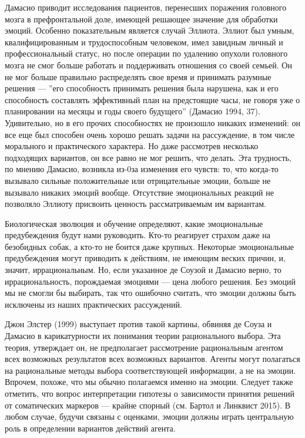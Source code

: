 \documentclass[11pt]{book}
\begin{document}
Дамасио приводит исследования пациентов, перенесших поражения головного мозга в префронтальной доле, имеющей решающее значение для обработки эмоций. Особенно показательным является случай Эллиота. Эллиот был умным, квалифицированным и трудоспособным человеком, имел завидным личный и профессиональный статус, но после операции по удалению опухоли головного мозга не смог больше работать и поддерживать отношения со своей семьей. Он не мог больше правильно распределять свое время и принимать разумные решения --- ''его способность принимать решения была нарушена, как и его способность составлять эффективный план на предстоящие часы, не говоря уже о планировании на месяцы и годы своего будущего'' (Дамасио 1994, 37). Удивительно, но в его прочих способностях не произошло никаких изменений: он все еще был способен очень хорошо решать задачи на рассуждение, в том числе морального и практического характера. Но даже рассмотрев несколько подходящих вариантов, он все равно не мог решить, что делать. Эта трудность, по мнению Дамасио, возникла из-0за изменения его чувств: то, что когда-то вызывало сильные положительные или отрицательные эмоции, больше не вызывало никаких эмоций вообще. Отсутствие эмоциональных реакций не позволяло Эллиоту присвоить ценность рассматриваемым им вариантам.

Биологическая эволюция и обучение определяют, какие эмоциональные предубеждения будут нами руководить. Кто-то реагирует страхом даже на безобидных собак, а кто-то не боится даже крупных. Некоторые эмоциональные предубеждения могут приводить к действиям, не имеющим веских причин, и, значит, иррациональным. Но, если указанное де Соузой и Дамасио верно, то иррациональность, порождаемая эмоциями --- цена любого решения. Без эмоций мы не смогли бы выбирать, так что ошибочно считать, что эмоции должны быть исключены из наших практических рассуждений.

Джон Элстер (1999) выступает против такой картины, обвиняя де Соуза и Дамасио в карикатурности их понимания теории рационального выбора. Эта теория, утверждает он, не предполагает рассмотрение рациональным агентом всех возможных результатов всех возможных вариантов. Агенты могут полагаться на рациональные методы выбора соответствующей информации, а не на эмоции. Впрочем, похоже, что мы обычно полагаемся именно на эмоции. Следует также отметить, что вопрос интерпретации гипотезы о зависимости принятия решений от соматических маркеров --- крайне спорный (см. Бартол и Линквист 2015). В любом случае, будучи связаны с оценками, эмоции должны играть центральную роль в определении вариантов действий агента.
\end{document}
